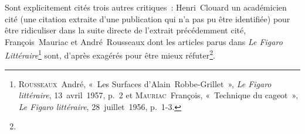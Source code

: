 \documentclass[12pt, a4paper]{article}
\begin{document}
Sont explicitement cités trois autres critiques~: Henri~Clouard un académicien cité (une citation extraite d'une publication qui n'a pas pu être identifiée) pour être ridiculiser dans la suite directe de l'extrait précédemment cité, François~Mauriac et André~Rousseaux dont les articles parus dans \textit{Le Figaro Littéraire}\footnote{\textsc{Rousseaux}~André, «~Les Surfaces d’Alain~Robbe-Grillet~», \textit{Le Figaro littéraire}, 13~avril~1957, p.~2 et \textsc{Mauriac}~François, «~Technique du cageot~», \textit{Le Figaro littéraire}, 28~juillet~1956, p.~1-3.} sont, d'après \galia{} exagérés pour être mieux réfuter\footnote{}. 
\end{document}
